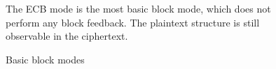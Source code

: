 \begin{figure}
\begin{minipage}{0.8\textwidth}
    \bigskip
  \end{minipage}

  \begin{footnotesize}
    The ECB mode is the most basic block mode, which does not perform any block feedback. The plaintext structure is still observable in the ciphertext.
  \end{footnotesize}

  \caption{Basic block modes}
  \label{figure/block-modes}
\end{figure}
